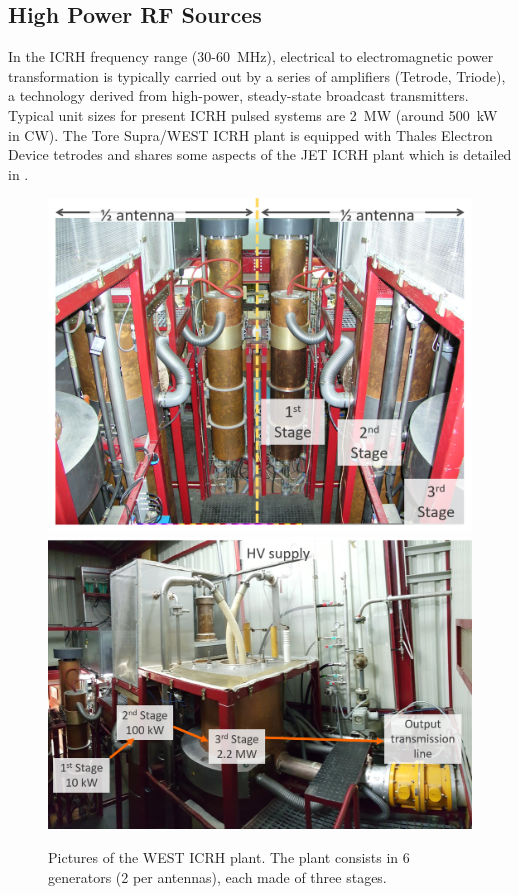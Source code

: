 \subsection{High Power RF Sources}


In the ICRH frequency range (30-60~\si{MHz}), electrical to electromagnetic power transformation is typically carried out by a series of amplifiers (Tetrode, Triode), a technology derived from high-power, steady-state broadcast transmitters. Typical unit sizes for present ICRH pulsed systems are 2~\si{MW} (around 500~\si{kW} in CW). The Tore Supra/WEST ICRH plant is equipped with Thales Electron Device tetrodes and shares some aspects of the JET ICRH plant which is detailed in .

\begin{figure}[h]
	\centering
	\includegraphics[width=0.49\linewidth]{figures/chap1/ToreSupra_ICRH_plant}
	\includegraphics[width=0.49\linewidth]{figures/chap1/ToreSupra_ICRH_plant2}
	\caption{Pictures of the WEST ICRH plant. The plant consists in 6 generators (2 per antennas), each made of three stages.}
	\label{fig:toresupraicrhplant}
\end{figure}

